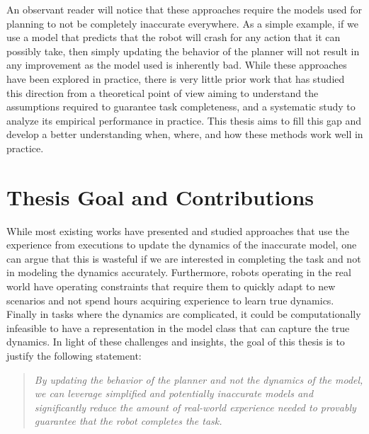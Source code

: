 An observant reader will notice that these approaches require the models used
for planning to not be completely inaccurate everywhere. As a simple example, if
we use a model that predicts that the robot will crash for any action that it
can possibly take, then simply updating the behavior of the planner will not
result in any improvement as the model used is inherently bad.
While these
approaches have been explored in practice, there is very little prior work that has studied this
direction from a theoretical point of view aiming to understand the
assumptions required to guarantee task completeness, and a systematic
study to analyze its empirical performance in practice. This thesis
aims to fill this gap and develop a better understanding when, where,
and how these methods work well in practice.

\section{Thesis Goal and Contributions}
\label{sec:thes-goal-contr}

While most existing works have presented and studied approaches that
use the experience from executions to update the dynamics of the
inaccurate model, one can argue that this is wasteful if we are interested in
completing the task and not in modeling the dynamics
accurately. Furthermore, robots operating in the real world have
operating constraints that require them to quickly adapt to
new scenarios and not spend hours acquiring experience to learn true
dynamics. Finally in tasks where the dynamics are complicated, it could be
computationally infeasible to have a representation in the model class that can
capture the true dynamics. In light of these challenges and insights, the goal
of this thesis is to justify the following statement:

\begin{quote}
\textit{By updating the
behavior of the planner and not the dynamics of the model, we can
leverage simplified and potentially inaccurate models and
significantly reduce the amount of real-world experience needed to
provably guarantee that the robot completes the task.}
\end{quote}

